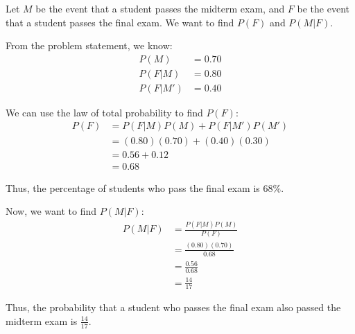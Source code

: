 \documentclass[a4paper, 10pt]{article}
\begin{document}
\begin{solution}
Let \( M \) be the event that a student passes the midterm exam, and \( F \) be the event that a student passes the final exam.
We want to find \( P(F) \) and \( P(M | F) \).

\par From the problem statement, we know:
\begin{align*}
    P(M) &= 0.70 \\
    P(F | M) &= 0.80 \\
    P(F | M') &= 0.40
\end{align*}

\par We can use the law of total probability to find \( P(F) \):
\begin{align*}
    P(F) &= P(F | M) P(M) + P(F | M') P(M') \\
    &= (0.80)(0.70) + (0.40)(0.30) \\
    &= 0.56 + 0.12 \\
    &= 0.68
\end{align*}

Thus, the percentage of students who pass the final exam is \( \boxed{68\%} \).

\par Now, we want to find \( P(M | F) \):
\begin{align*}
    P(M | F) &= \frac{P(F | M) P(M)}{P(F)} \\
    &= \frac{(0.80)(0.70)}{0.68} \\
    &= \frac{0.56}{0.68} \\
    &= \frac{14}{17}
\end{align*}

Thus, the probability that a student who passes the final exam also passed the midterm exam is \( \boxed{\frac{14}{17}} \).
\end{solution}
\end{document}
